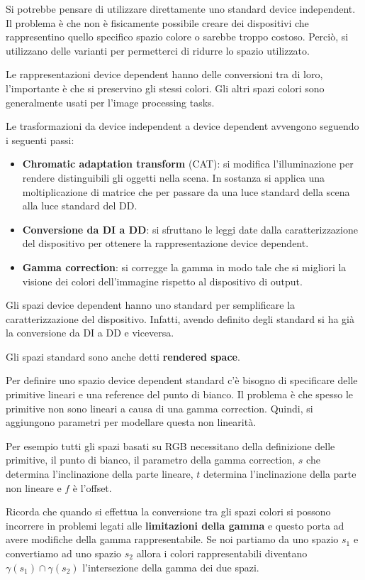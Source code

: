 Si potrebbe pensare di utilizzare direttamente uno standard device independent.
Il problema è che non è fisicamente possibile creare dei dispositivi che
rappresentino quello specifico spazio colore o sarebbe troppo costoso.
Perciò, si utilizzano delle varianti per permetterci di ridurre lo spazio
utilizzato.

Le rappresentazioni device dependent hanno delle conversioni tra di loro,
l'importante è che si preservino gli stessi colori. Gli altri spazi colori sono
generalmente usati per l'image processing tasks.

Le trasformazioni da device independent a device dependent avvengono seguendo i
seguenti passi:
\begin{itemize}
    \item \textbf{Chromatic adaptation transform} (CAT): si modifica l'illuminazione
          per rendere distinguibili gli oggetti nella scena. In sostanza si
          applica una moltiplicazione di matrice che per passare da una luce
          standard della scena alla luce standard del DD.
    \item \textbf{Conversione da DI a DD}: si sfruttano le leggi date dalla
          caratterizzazione del dispositivo per ottenere la rappresentazione
          device dependent.
    \item \textbf{Gamma correction}: si corregge la gamma in modo tale che si
          migliori la visione dei colori dell'immagine rispetto al dispositivo
          di output.
\end{itemize}

Gli spazi device dependent hanno uno standard per semplificare la
caratterizzazione del dispositivo. Infatti, avendo definito degli standard si
ha già la conversione da DI a DD e viceversa.
\begin{nota}
    Gli spazi standard sono anche detti \textbf{rendered space}.
\end{nota}

Per definire uno spazio device dependent standard c'è bisogno di specificare
delle primitive lineari e una reference del punto di bianco. Il problema è che
spesso le primitive non sono lineari a causa di una gamma correction. Quindi, si
aggiungono parametri per modellare questa non linearità.

\begin{nota}
    Per esempio tutti gli spazi basati su RGB necessitano della definizione delle
    primitive, il punto di bianco, il parametro della gamma correction, $s$ che
    determina l'inclinazione della parte lineare, $t$  determina l'inclinazione
    della parte non lineare e $f$ è l'offset.
\end{nota}

Ricorda che quando si effettua la conversione tra gli spazi colori si possono
incorrere in problemi legati alle \textbf{limitazioni della gamma} e questo porta
ad avere modifiche della gamma rappresentabile. Se noi partiamo da uno spazio
$s_1$ e convertiamo ad uno spazio $s_2$ allora i colori rappresentabili diventano
$\gamma(s_1)\cap \gamma(s_2)$ l'intersezione della gamma dei due spazi.


